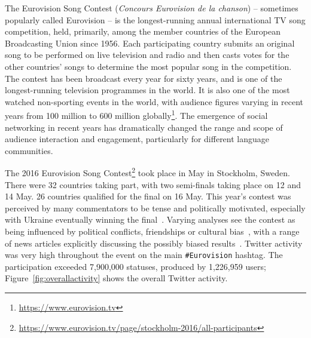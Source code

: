 \documentclass[conference]{IEEEtran}
\begin{document}
The Eurovision Song Contest ({\emph{Concours Eurovision de la
chanson}}) -- sometimes popularly called Eurovision -- is the
longest-running annual international TV song competition, held,
primarily, among the member countries of the European Broadcasting
Union since 1956. Each participating country submits an original
song to be performed on live television and radio and then casts votes
for the other countries' songs to determine the most popular song in
the competition. The contest has been broadcast every year for sixty
years, and is one of the longest-running television programmes in the
world. It is also one of the most watched non-sporting events in the
world, with audience figures varying in recent years from 100 million
to 600 million globally\footnote{\url{https://www.eurovision.tv}}. The
emergence of social networking in recent years has dramatically
changed the range and scope of audience interaction and engagement,
particularly for different language communities.

The 2016 Eurovision Song
Contest\footnote{\url{https://www.eurovision.tv/page/stockholm-2016/all-participants}}
took place in May in Stockholm, Sweden. There were 32 countries taking
part, with two semi-finals taking place on 12 and 14 May. 26 countries
qualified for the final on 16 May. This year’s contest was perceived
by many commentators to be tense and politically motivated, especially
with Ukraine eventually winning the
final~\cite{telegrapheuroboycott:2016}. Varying analyses see the
contest as being influenced by political conflicts, friendships or
cultural
bias~\cite{ginsburgh+noury:2008,charron:2013,blangiardo+baio:2014,budzinski+pannicke:2016},
with a range of news articles explicitly discussing the possibly
biased results~\cite{telegrapheurobias:2016}.  Twitter activity was
very high throughout the event on the main {\texttt{\#Eurovision}}
hashtag. The participation exceeded 7,900,000 statuses, produced by
1,226,959 users; Figure~\ref{fig:overallactivity} shows the overall
Twitter activity.
\end{document}
